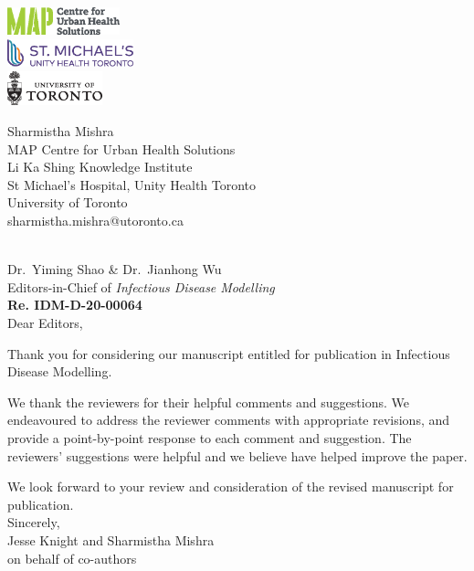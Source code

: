 \documentclass{article}
\begin{document}
\begin{minipage}{0.5\linewidth}
  \includegraphics[height=0.8cm]{map-cuhs.eps}\\[1ex]
  \includegraphics[height=0.8cm]{smh.eps}     \\[1ex]
  \includegraphics[height=1.0cm]{uoft.eps}
\end{minipage}%
\begin{minipage}{0.5\linewidth}
  \begin{flushright}\small
    Sharmistha Mishra\\
    MAP Centre for Urban Health Solutions\\
    Li Ka Shing Knowledge Institute\\
    St Michael's Hospital,
    Unity Health Toronto\\
    University of Toronto\\
    sharmistha.mishra@utoronto.ca
  \end{flushright}
\end{minipage}
\\[3ex]
Dr.\ Yiming Shao \& Dr.\ Jianhong Wu\\
Editors-in-Chief of \textit{Infectious Disease Modelling}\\[2ex]
\textbf{Re. IDM-D-20-00064}\\[1em]
Dear Editors,
\par
Thank you for considering our manuscript entitled
\emph{\unskip} for publication in Infectious Disease Modelling.
\par
We thank the reviewers for their helpful comments and suggestions.
We endeavoured to address the reviewer comments with appropriate revisions, and 
provide a point-by-point response to each comment and suggestion.
The reviewers' suggestions were helpful and we believe have helped improve the paper.
\par
We look forward to your review and consideration of the revised
manuscript for publication.
\\[2em]
Sincerely,\\[1em]
Jesse Knight and Sharmistha Mishra\\
on behalf of co-authors
\clearpage

\end{document}
